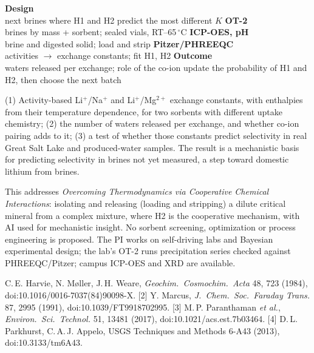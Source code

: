 \documentclass[11pt,letterpaper]{article}
\begin{document}
\wpflow
  {\textbf{Design}\\ next brines where H1 and H2 predict the most different $K$}
  {\textbf{OT-2}\\ brines by mass + sorbent; sealed vials, RT--65\,$^\circ$C}
  {\textbf{ICP-OES, pH}\\ brine and digested solid; load and strip}
  {\textbf{Pitzer/PHREEQC}\\ activities $\rightarrow$ exchange constants; fit H1, H2}
  {\textbf{Outcome}\\ waters released per exchange; role of the co-ion}
  {update the probability of H1 and H2, then choose the next batch}

 (1) Activity-based Li$^+$/Na$^+$ and Li$^+$/Mg$^{2+}$ exchange constants,
with enthalpies from their temperature dependence, for two sorbents with different uptake chemistry;
(2) the number of waters released per exchange, and whether co-ion pairing adds to it; (3) a test of
whether those constants predict selectivity in real Great Salt Lake and produced-water samples. The
result is a mechanistic basis for predicting selectivity in brines not yet measured, a step toward
domestic lithium from brines.

 This addresses \emph{Overcoming Thermodynamics via Cooperative Chemical
Interactions}: isolating and releasing (loading and stripping) a dilute critical mineral from a
complex mixture, where H2 is the cooperative mechanism, with AI used for mechanistic insight. No sorbent screening, optimization
or process engineering is proposed. The PI works on self-driving labs and Bayesian experimental
design; the lab's OT-2 runs precipitation series checked against PHREEQC/Pitzer; campus ICP-OES and
XRD are available.

\begin{wprefs}
[1] C.\,E. Harvie, N. M{\o}ller, J.\,H. Weare, \emph{Geochim.\ Cosmochim.\ Acta} 48, 723 (1984),
doi:10.1016/0016-7037(84)90098-X.
[2] Y. Marcus, \emph{J.\ Chem.\ Soc.\ Faraday Trans.} 87, 2995 (1991), doi:10.1039/FT9918702995.
[3] M.\,P. Paranthaman \emph{et al.}, \emph{Environ.\ Sci.\ Technol.} 51, 13481 (2017),
doi:10.1021/acs.est.7b03464.
[4] D.\,L. Parkhurst, C.\,A.\,J. Appelo, USGS Techniques and Methods 6-A43 (2013), doi:10.3133/tm6A43.
\end{wprefs}
\end{document}
